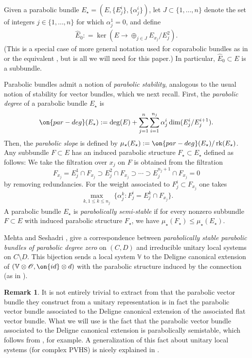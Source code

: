 \documentclass[12 pt]{amsart}
\theoremstyle{plain}
\theoremstyle{definition}
\newtheorem{remark}[subsubsection]{Remark}
\theoremstyle{remark}
\numberwithin{equation}{section}
\DeclareMathOperator\rk{rk}
\begin{document}
Given a parabolic bundle
$E_\star = (E, \{E^i_j\}, \{\alpha^i_j\})$,
let $J \subset \{1, \ldots, n\}$ denote the set of 
integers $j \in \{1, \ldots, n\}$ for which $\alpha^1_j = 0$, and define
\begin{align*}
\widehat{E}_0 : = \ker( E \to \oplus_{j \in J} E_{x_j}/E_j^2).
\end{align*}
(This is a special case of more general notation used for coparabolic bundles
as in \cite[2.2.8]{LL:geometric-local-systems} or the equivalent
\cite[Definition 2.3]{bodenY:moduli-spaces-of-parabolic-higgs-bundles}, but is all we will need for this
paper.)
In particular, $\widehat{E}_0 \subset E$ is a subbundle.

Parabolic
bundles admit a notion of \emph{parabolic stability}, analogous to the usual
notion of stability for vector bundles, which we next recall. 
First, the {\em parabolic degree} of a parabolic bundle $E_\star$ is
\begin{align*}
	\on{par-deg}(E_\star) := \deg(E) + \sum_{j=1}^n \sum_{i=1}^{n_j}
	\alpha^i_j \dim(E_j^i/E_j^{i+1}).
\end{align*}
Then, the {\em parabolic slope} is defined by $\mu_\star(E_\star) :=
\on{par-deg}(E_\star)/\rk(E_\star)$.
Any subbundle $F \subset E$ has an induced parabolic structure $F_\star \subset
E_\star$ defined as
follows:
We take the filtration
over $x_j$ on $F$ is obtained
	from the filtration $$F_{x_j} = E^1_j \cap F_{x_j} \supset E^2_j \cap
	F_{x_j} \supset \cdots \supset E^{n_j+1}_j \cap F_{x_j} = 0$$
	by removing redundancies. For the weight associated to $F^i_j \subset
	F_{x_j}$ one takes $$\max_{\substack{k, 1 \leq k \leq n_j}} \{ \alpha^k_j : F^i_j = E^k_j \cap
	F_{x_j}\}.$$
A parabolic bundle $E_\star$ is {\em parabolically semi-stable} if for every
nonzero subbundle $F \subset E$ with
induced parabolic structure $F_\star$, we have $\mu_\star(F_\star) \leq
\mu_\star(E_\star)$.

Mehta and Seshadri 
\cite[Theorem 4.1, Remark 4.3]{mehta1980moduli},
give a correspondence between
\emph{parabolically stable parabolic bundles of parabolic degree zero} on
$(C,D)$ and irreducible unitary local systems on $C\setminus D$.
This bijection sends a local system $\mathbb{V}$ to the Deligne canonical extension of $(\mathbb{V}\otimes \mathscr{O}, \on{id}\otimes d)$ with the parabolic structure induced by the connection (as in \cite[Definition 3.3.1]{LL:geometric-local-systems}). 

\begin{remark}
It is not entirely trivial to extract from \cite{mehta1980moduli} that the parabolic vector bundle they construct from a unitary representation is in fact the parabolic vector bundle associated to the Deligne canonical extension of the associated flat vector bundle. What we will use is the fact that the parabolic vector bundle associated to the Deligne canonical extension is parabolically semistable, which follows from \cite[Theorem 5]{simpson1990harmonic}, for example. A generalization of this fact about unitary local systems (for complex PVHS) is nicely explained in \cite[\S5]{arapura2019vanishing}.
\end{remark}
\end{document}

